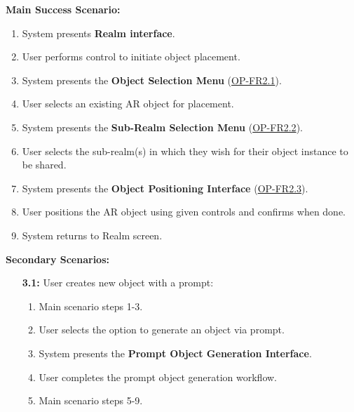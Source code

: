 \documentclass{article}
\begin{document}
\begin{enumerate}[label=\textbf{UC\arabic*}]
          \textbf{Main Success Scenario:}
          \begin{enumerate}[label=\textbf{\arabic*.}]
              \item System presents \textbf{Realm interface}.
              \item User performs control to initiate object placement.
              \item System presents the \textbf{Object Selection Menu} (\hyperref[ssub:object_placement]{OP-FR2.1}).
              \item User selects an existing AR object for placement.
              \item System presents the \textbf{Sub-Realm Selection Menu} (\hyperref[ssub:object_placement]{OP-FR2.2}).
              \item User selects the sub-realm(s) in which they wish for their object instance to be shared.
              \item System presents the \textbf{Object Positioning Interface} (\hyperref[ssub:object_placement]{OP-FR2.3}).
              \item User positions the AR object using given controls and confirms when done.
              \item System returns to Realm screen.
          \end{enumerate}

          \textbf{Secondary Scenarios:}
          \begin{itemize}
              \item[{\bf 3.1:}] User creates new object with a prompt:
                    \begin{enumerate}[label=\textbf{\arabic*.}]
                        \item Main scenario steps 1-3.
                        \item User selects the option to generate an object via prompt.
                        \item System presents the \textbf{Prompt Object Generation Interface}.
                        \item User completes the prompt object generation workflow.
                        \item Main scenario steps 5-9.
                    \end{enumerate}


\end{itemize}
\end{enumerate}
\end{document}
